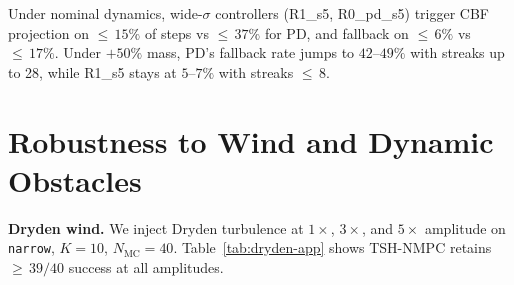 \documentclass[11pt,onecolumn,a4paper]{article}
\newcommand{\Nm}{N_{\mathrm{MC}}}
\begin{document}
\begin{appendices}
\begin{table}[t]
\centering
\caption{CBF fallback-invocation audit ($\Nm = 40$ per cell).
Active\% = fraction of steps where CBF projection was triggered;
Fallback\% = fraction where QP was infeasible and emergency fallback
invoked.}\label{tab:fallback-app}
\end{table}

Under nominal dynamics, wide-$\sigma$ controllers (R1\_s5, R0\_pd\_s5)
trigger CBF projection on ${\le}\,15\%$ of steps vs ${\le}\,37\%$ for
PD, and fallback on ${\le}\,6\%$ vs ${\le}\,17\%$. Under $+50\%$
mass, PD's fallback rate jumps to $42$--$49\%$ with streaks up to 28,
while R1\_s5 stays at $5$--$7\%$ with streaks ${\le}\,8$.

\section{Robustness to Wind and Dynamic Obstacles}\label{app:robust-details}

\textbf{Dryden wind.}
We inject Dryden turbulence at $1\times$, $3\times$, and $5\times$
amplitude on \texttt{narrow}, $K = 10$, $\Nm = 40$. Table~\ref{tab:dryden-app}
shows TSH-NMPC retains ${\ge}\,39/40$ success at all amplitudes.


\end{appendices}
\end{document}
